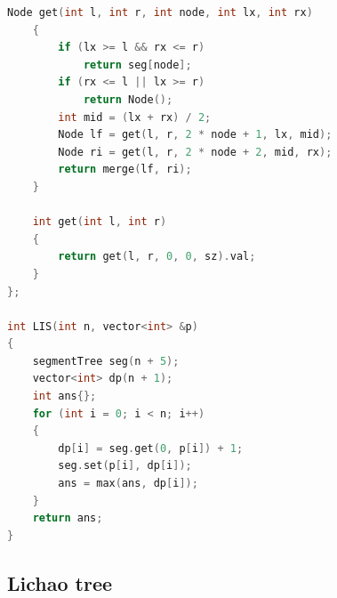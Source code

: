\documentclass[10pt,landscape,a4paper,twocolumn]{article}
\begin{document}
\begin{lstlisting}[language=C++]
    Node get(int l, int r, int node, int lx, int rx)
    {
        if (lx >= l && rx <= r)
            return seg[node];
        if (rx <= l || lx >= r)
            return Node();
        int mid = (lx + rx) / 2;
        Node lf = get(l, r, 2 * node + 1, lx, mid);
        Node ri = get(l, r, 2 * node + 2, mid, rx);
        return merge(lf, ri);
    }

    int get(int l, int r)
    {
        return get(l, r, 0, 0, sz).val;
    }
};

int LIS(int n, vector<int> &p)
{
    segmentTree seg(n + 5);
    vector<int> dp(n + 1);
    int ans{};
    for (int i = 0; i < n; i++)
    {
        dp[i] = seg.get(0, p[i]) + 1;
        seg.set(p[i], dp[i]);
        ans = max(ans, dp[i]);
    }
    return ans;
}

\end{lstlisting}
\subsection{Lichao tree}
\end{document}
